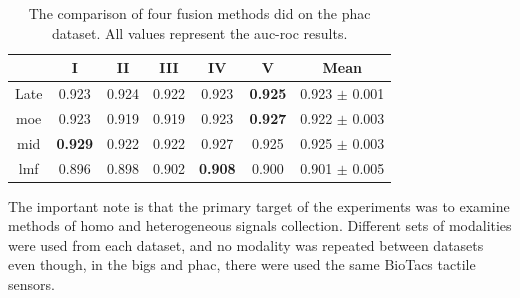 \documentclass[a4paper, 10pt, twoside]{report}
\begin{document}
\begin{table}[H]
\centering
\caption{The comparison of four fusion methods did on the \acrshort{phac} dataset. All values represent the \acrshort{auc}-\acrshort{roc} results.}
\begin{tabular}{ccccccc}
\toprule
\textbf{}                                                  & \textbf{I}                                                    & \textbf{II}                  & \textbf{III}                 & \textbf{IV}                                                   & \textbf{V}                                                    & \textbf{Mean}                                     \\ \midrule
\multicolumn{1}{c}{{\color[HTML]{000000} Late}} & {\color[HTML]{000000} 0.923}                                  & {\color[HTML]{000000} 0.924} & {\color[HTML]{000000} 0.922} & {\color[HTML]{000000} 0.923}                                  & \color[HTML]{000000} \textbf{0.925} & {\color[HTML]{000000} 0.923 $\pm$ 0.001} \\ \midrule
\multicolumn{1}{c}{{\color[HTML]{000000} \acrshort{moe}}}  & {\color[HTML]{000000} 0.923}                                  & {\color[HTML]{000000} 0.919} & {\color[HTML]{000000} 0.919} & {\color[HTML]{000000} 0.923}                                  &\color[HTML]{000000} \textbf{0.927} & {\color[HTML]{000000} 0.922 $\pm$ 0.003} \\ \midrule
\multicolumn{1}{c}{{\color[HTML]{000000} \acrshort{mid}}}  & \color[HTML]{000000} \textbf{0.929} & {\color[HTML]{000000} 0.922} & {\color[HTML]{000000} 0.922} & {\color[HTML]{000000} 0.927}                                  & {\color[HTML]{000000} 0.925}                                  & {\color[HTML]{000000} 0.925 $\pm$ 0.003} \\ \midrule
\multicolumn{1}{c}{{\color[HTML]{000000} \acrshort{lmf}}}  & {\color[HTML]{000000} 0.896}                                  & {\color[HTML]{000000} 0.898} & {\color[HTML]{000000} 0.902} & \color[HTML]{000000} \textbf{0.908} & {\color[HTML]{000000} 0.900}                                  & {\color[HTML]{000000} 0.901 $\pm$ 0.005} \\ \bottomrule
\end{tabular}
\label{tab:phac_results}
\end{table}
\unskip

The important note is that the primary target of the experiments was to examine methods of homo and heterogeneous signals collection. Different sets of modalities were used from each dataset, and no modality was repeated between datasets even though, \eg in the \acrshort{bigs} and \acrshort{phac}, there were used the same BioTacs tactile sensors.
\end{document}
